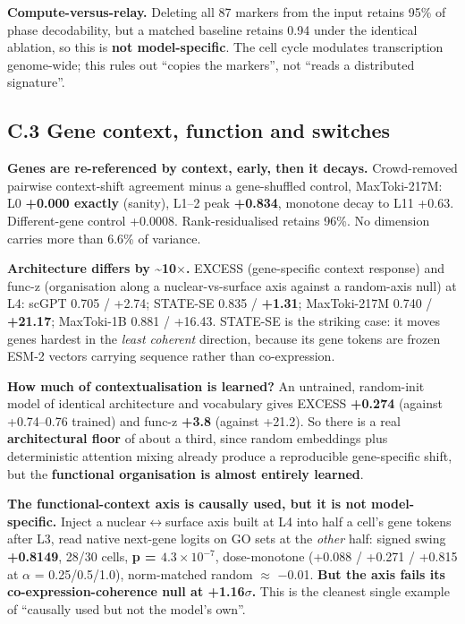 \textbf{Compute-versus-relay.} Deleting all 87 markers from the input retains 95\% of phase decodability,
but a matched baseline retains 0.94 under the identical ablation, so this is \textbf{not model-specific}.
The cell cycle modulates transcription genome-wide; this rules out ``copies the markers'', not ``reads a
distributed signature''.

\hypertarget{c.3-gene-context-function-and-switches}{%
\subsection{C.3 Gene context, function and switches}\label{c.3-gene-context-function-and-switches}}

\textbf{Genes are re-referenced by context, early, then it decays.} Crowd-removed pairwise context-shift
agreement minus a gene-shuffled control, MaxToki-217M: L0 \textbf{+0.000 exactly} (sanity), L1--2 peak
\textbf{+0.834}, monotone decay to L11 +0.63. Different-gene control +0.0008. Rank-residualised retains 96\%.
No dimension carries more than 6.6\% of variance.

\textbf{Architecture differs by \textasciitilde10\(\times\).} EXCESS (gene-specific context response) and func-z (organisation
along a nuclear-vs-surface axis against a random-axis null) at L4: scGPT 0.705 / +2.74; STATE-SE
0.835 / \textbf{+1.31}; MaxToki-217M 0.740 / \textbf{+21.17}; MaxToki-1B 0.881 / +16.43. STATE-SE is the striking
case: it moves genes hardest in the \emph{least coherent} direction, because its gene tokens are frozen
ESM-2 vectors carrying sequence rather than co-expression.

\textbf{How much of contextualisation is learned?} An untrained, random-init model of identical architecture
and vocabulary gives EXCESS \textbf{+0.274} (against +0.74--0.76 trained) and func-z \textbf{+3.8} (against
+21.2). So there is a real \textbf{architectural floor} of about a third, since random embeddings plus
deterministic attention mixing already produce a reproducible gene-specific shift, but the
\textbf{functional organisation is almost entirely learned}.

\textbf{The functional-context axis is causally used, but it is not model-specific.} Inject a
nuclear\(\leftrightarrow\)surface axis built at L4 into half a cell's gene tokens after L3, read native next-gene logits
on GO sets at the \emph{other} half: signed swing \textbf{+0.8149}, 28/30 cells, \textbf{p = \(4.3\times10^{-7}\)}, dose-monotone
(+0.088 / +0.271 / +0.815 at \(\alpha\) = 0.25/0.5/1.0), norm-matched random \(\approx\) \(-\)0.01. \textbf{But the axis fails its
co-expression-coherence null at +1.16\(\sigma\).} This is the cleanest single example of ``causally used but not
the model's own''.

